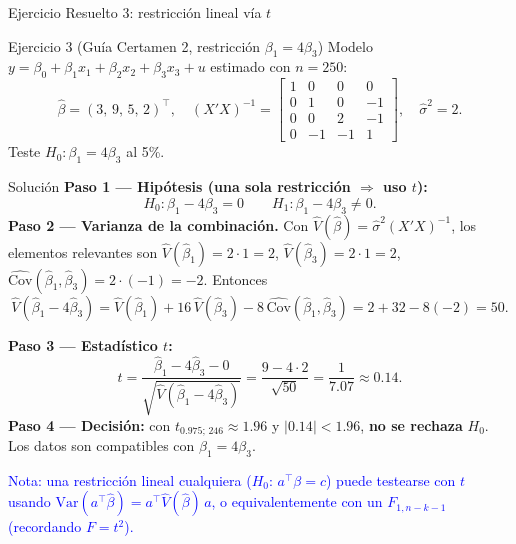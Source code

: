 \documentclass{beamer}
\begin{document}
\begin{frame}[allowframebreaks]{Ejercicio Resuelto 3: restricción lineal vía $t$}

\begin{block}{Ejercicio 3 (Guía Certamen 2, restricción $\beta_1=4\beta_3$)}
Modelo $y = \beta_0 + \beta_1 x_1 + \beta_2 x_2 + \beta_3 x_3 + u$ estimado con $n=250$:
\[
\hat{\beta} = (3,\,9,\,5,\,2)^{\top},\quad
(X'X)^{-1}=\begin{bmatrix} 1&0&0&0\\ 0&1&0&-1\\ 0&0&2&-1\\ 0&-1&-1&1\end{bmatrix},\quad \hat{\sigma}^2 = 2.
\]
Teste $H_0:\beta_1 = 4\beta_3$ al 5\%.
\end{block}

\pause

\begin{exampleblock}{Solución}
\textbf{Paso 1 — Hipótesis (una sola restricción $\Rightarrow$ uso $t$):}
\[
H_0: \beta_1 - 4\beta_3 = 0 \qquad H_1: \beta_1 - 4\beta_3 \neq 0.
\]
\textbf{Paso 2 — Varianza de la combinación.} Con $\hat{V}(\hat{\beta}) = \hat{\sigma}^2 (X'X)^{-1}$, los elementos relevantes son
$\hat{V}(\hat{\beta}_1)=2\cdot 1 = 2$, $\hat{V}(\hat{\beta}_3)=2\cdot 1 = 2$, $\widehat{\text{Cov}}(\hat{\beta}_1,\hat{\beta}_3)=2\cdot(-1)=-2$. Entonces
\[
\hat{V}(\hat{\beta}_1 - 4\hat{\beta}_3) = \hat{V}(\hat{\beta}_1) + 16\,\hat{V}(\hat{\beta}_3) - 8\,\widehat{\text{Cov}}(\hat{\beta}_1,\hat{\beta}_3)
= 2 + 32 - 8(-2) = 50.
\]

\framebreak

\textbf{Paso 3 — Estadístico $t$:}
\[
t = \frac{\hat{\beta}_1 - 4\hat{\beta}_3 - 0}{\sqrt{\hat{V}(\hat{\beta}_1-4\hat{\beta}_3)}}
  = \frac{9 - 4\cdot 2}{\sqrt{50}} = \frac{1}{7.07} \approx 0.14.
\]
\textbf{Paso 4 — Decisión:} con $t_{0.975;\,246}\approx 1.96$ y $|0.14| < 1.96$, \textbf{no se rechaza} $H_0$. Los datos son compatibles con $\beta_1 = 4\beta_3$.

\medskip
\textcolor{blue}{Nota: una restricción lineal cualquiera ($H_0:\,a^{\top}\beta = c$) puede testearse con $t$ usando $\text{Var}(a^{\top}\hat{\beta}) = a^{\top}\hat{V}(\hat{\beta})\,a$, o equivalentemente con un $F_{1,n-k-1}$ (recordando $F=t^2$).}
\end{exampleblock}

\end{frame}
\end{document}
